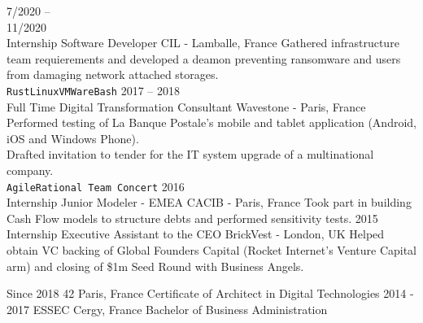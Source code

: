 \documentclass[10pt]{developercv} %
\begin{document}
\begin{entrylist}
	\entry
		{7/2020 --\\11/2020\\\footnotesize{Internship}}
		{Software Developer}
		{CIL - Lamballe, France}
		{Gathered infrastructure team requierements and developed a deamon preventing ransomware and users from damaging network attached storages.\\
		\texttt{Rust}\slashsep\texttt{Linux}\slashsep\texttt{VMWare}\slashsep\texttt{Bash}}
	\entry
		{2017 -- 2018\\\footnotesize{Full Time}}
		{Digital Transformation Consultant}
		{Wavestone - Paris, France}
		{Performed testing of La Banque Postale's mobile and tablet application (Android, iOS and Windows Phone).\\Drafted invitation to tender for the IT system upgrade of a multinational company.\\ \texttt{Agile}\slashsep\texttt{Rational Team Concert}}
	\entry
		{2016\\\footnotesize{Internship}}
		{Junior Modeler - EMEA}
		{CACIB - Paris, France}
		{Took part in building Cash Flow models to structure debts and performed sensitivity tests.}
	\entry
		{2015\\\footnotesize{Internship}}
		{Executive Assistant to the CEO}
		{BrickVest - London, UK}
		{Helped obtain VC backing of Global Founders Capital (Rocket Internet’s Venture Capital arm) and closing of \$1m Seed Round with Business Angels.}
\end{entrylist}



\begin{entrylist}
	\entry
		{Since 2018}
		{42}
		{Paris, France}
		{Certificate of Architect in Digital Technologies}
	\entry
		{2014 - 2017}
		{ESSEC}
		{Cergy, France}
		{Bachelor of Business Administration}
\end{entrylist}

\end{document}
